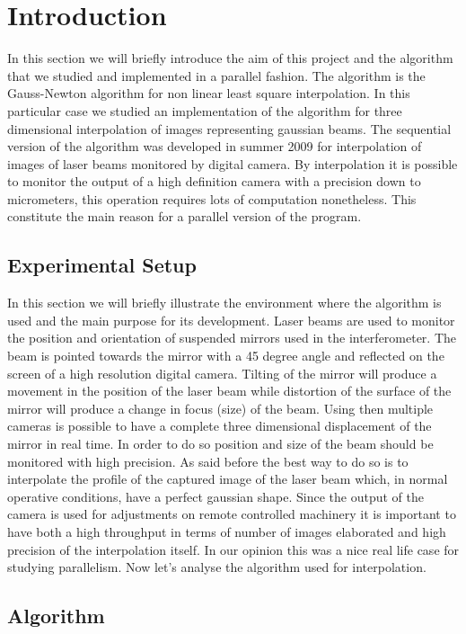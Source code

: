 \section{Introduction}  

In this section we will briefly introduce the aim of this project and the algorithm that we studied and implemented in a parallel fashion.
The algorithm is the Gauss-Newton algorithm for non linear least square interpolation.
In this particular case we studied an implementation of the algorithm for three dimensional interpolation of images representing gaussian beams.
The sequential version of the algorithm was developed in summer 2009 for interpolation of images of laser beams monitored by digital camera. 
By interpolation it is possible to monitor the output of a high definition camera with a precision down to micrometers, this operation requires lots of computation nonetheless.
This constitute the main reason for a parallel version of the program.

\subsection{Experimental Setup}

In this section we will briefly illustrate the environment where the algorithm is used and the main purpose for its development.
Laser beams are used to monitor the position and orientation of suspended mirrors used in the interferometer. 
The beam is pointed towards the mirror with a 45 degree angle and reflected on the screen of a high resolution digital camera.
Tilting of the mirror will produce a movement in the position of the laser beam while distortion of the surface of the mirror will produce a change in focus (size) of the beam.
Using then multiple cameras is possible to have a complete three dimensional displacement of the mirror in real time.
In order to do so position and size of the beam should be monitored with high precision. 
As said before the best way to do so is to interpolate the profile of the captured image of the laser beam which, in normal operative conditions, have a perfect gaussian shape.
Since the output of the camera is used for adjustments on remote controlled machinery it is important to have both a high throughput in terms of number of images elaborated and high precision of the interpolation itself.
In our opinion this was a nice real life case for studying parallelism.
Now let's analyse the algorithm used for interpolation.

\subsection{Algorithm}


